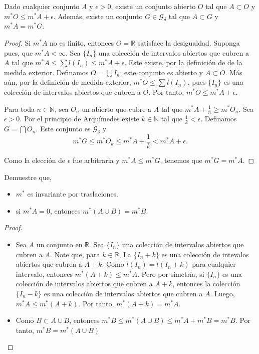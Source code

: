 \documentclass[12pt]{article}
\newenvironment{problem}[2][Problema]{\begin{trivlist}
\item[\hskip \labelsep {\bfseries #1}\hskip \labelsep {\bfseries #2.}]}{\end{trivlist}}
\begin{document}
\begin{problem}{5} Dado cualquier conjunto $A$ y $\epsilon > 0$, existe un conjunto abierto $O$ tal que $A \subset O $ y $m^\ast O \leq m^\ast A + \epsilon$. Además, existe un conjunto $G \in \mathcal G_\delta$ tal que $A \subset G$ y $m^\ast A = m^\ast G$.
\end{problem}
\begin{proof}
Si $m^\ast A$ no es finito, entonces $O = \mathbb R$ satisface la desigualdad. Suponga pues, que $m^\ast A < \infty$. Sea $\{I_n\}$ una colección de intervalos abiertos que cubren a $A$ tal que 
$m^\ast A \leq \sum l(I_n) \leq m^\ast A + \epsilon.$ Este existe, por la definición de de la medida exterior. Definamos $O = \bigcup I_n$; este conjunto es abierto y $ A \subset O$. Más aún, por la definición de medida exterior,  $m^\ast O \leq \sum l(I_n)$, pues $\{ I_n \}$ es una colección de intervalos abiertos que cubren a $O$. Por tanto, $m^\ast O \leq m^\ast A + \epsilon$.

Para toda $n \in \mathbb N$, sea $O_n$ un abierto que cubre a $A$ tal que 
$m^\ast A + \frac{1}{n} \geq m^\ast O_n$. Sea $\epsilon > 0$. Por el principio de Arquímedes existe $k \in \mathbb N$ tal que $\frac{1}{k} < \epsilon$. Definamos $G = \bigcap O_n$. Este conjunto es $\mathcal G_\delta$ y 
$$m^\ast G \leq m^\ast O_k \leq m^\ast A + \frac{1}{k} < m^\ast A + \epsilon.$$

Como la elección de $\epsilon$ fue arbitraria y $m^\ast A \leq m^\ast G$, tenemos que $m^\ast G = m^\ast A.$
\end{proof}

\begin{problem}{6} Demuestre que, 
\begin{itemize}
    \item[a)] $m^\ast$ es invariante por traslaciones. 
    \item[b)] si $m^\ast A = 0$, entonces $m^\ast (A \cup B) = m^\ast B.$ 
\end{itemize} 
\end{problem}

\begin{proof}
    \begin{itemize}
        \item[a)] Sea $A$ un conjunto en $\mathbb R$. Sea $\{ I_n \}$ una colección de intervalos abiertos que cubren a $A$. Note que, para $k \in \mathbb R$, La $\{ I_n + k \}$ es una colección de intevalos abiertos que cubren a $A + k.$ Como $l(I_n) = l(I_n + k)$ para cualquier intervalo, entonces $m^\ast( A + k ) \leq  m^\ast A.$ Pero por simetría, si $\{ I_n \}$ es una colección de intervalos abiertos que cubren a $A + k$, entonces la colección $\{ I_n - k \}$ es una colección de intervalos abiertos que cubren a $A$. Luego, $ m^\ast A \leq  m^\ast( A + k ).$  Por tanto, $m^\ast( A + k ) = m^\ast A.$

        \item[b)] Como $B \subset A \cup B$, entonces $m^\ast B \leq m^\ast(A \cup B) \leq m^\ast A + m^\ast B = m^\ast B$. Por tanto, $m^\ast B = m^\ast(A \cup B)$
     \end{itemize}
\end{proof}
\end{document}
